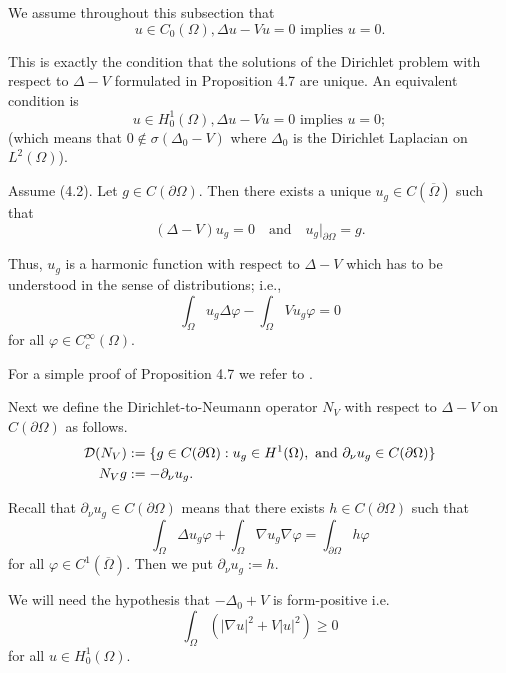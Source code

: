 We assume throughout this subsection that
\begin{equation} \tag{4.2}
u \in C_0(\Omega), \Delta u - Vu = 0 \text{ implies } u = 0.
\end{equation}

This is exactly the condition that the solutions of the Dirichlet problem with respect to $\Delta - V$ formulated in Proposition 4.7 are unique. An equivalent condition is
\begin{equation} \tag{4.3}
u \in H^1_0(\Omega), \Delta u - Vu = 0 \text{ implies } u = 0;
\end{equation}
(which means that $0 \notin \sigma(\Delta_0 - V)$ where $\Delta_0$ is the Dirichlet Laplacian on $L^2(\Omega)$).

\begin{proposition}[4.7]
Assume (4.2). Let $g \in C(\partial\Omega)$. Then there exists a unique $u_g \in C(\overline{\Omega})$ such that
\[(\Delta - V)u_g = 0 \quad \text{and} \quad u_g|_{\partial\Omega} = g.\]

Thus, $u_g$ is a harmonic function with respect to $\Delta - V$ which has to be understood in the sense of distributions; i.e.,
\[\int_\Omega u_g \Delta\varphi - \int_\Omega Vu_g \varphi = 0\]
for all $\varphi \in C_c^\infty(\Omega)$.
\end{proposition}

For a simple proof of Proposition 4.7 we refer to \cite{AtE19}.

Next we define the Dirichlet-to-Neumann operator $N_V$ with respect to $\Delta - V$ on $C(\partial\Omega)$ as follows.
\begin{align}
\mathcal{D}(N_V) &:= \{g \in C(\partial\Omega) : u_g \in H^1(\Omega), \text{ and } \partial_\nu u_g \in C(\partial\Omega)\} \\
N_V g &:= -\partial_\nu u_g.
\end{align}

Recall that $\partial_\nu u_g \in C(\partial\Omega)$ means that there exists $h \in C(\partial\Omega)$ such that
\[\int_\Omega \Delta u_g \varphi + \int_\Omega \nabla u_g \nabla\varphi = \int_{\partial\Omega} h\varphi\]
for all $\varphi \in C^1(\overline{\Omega})$. Then we put $\partial_\nu u_g := h$.

We will need the hypothesis that $-\Delta_0 + V$ is form-positive i.e.
\begin{equation} \tag{4.4}
\int_\Omega (|\nabla u|^2 + V|u|^2) \geq 0
\end{equation}
for all $u \in H^1_0(\Omega)$.

